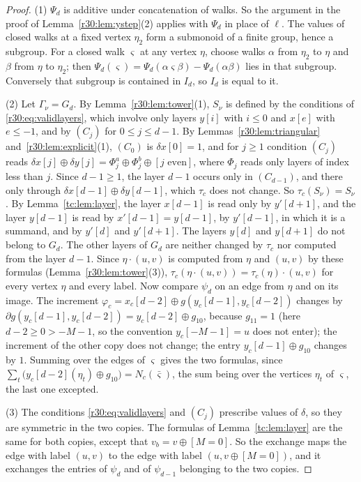 \begin{proof}
(1) $\Psi_d$ is additive under concatenation of walks. So the argument in the proof of Lemma~\ref{r30:lem:ystep}(2) applies with $\Psi_d$ in place of $\ell$. The values of closed walks at a fixed vertex $\eta_2$ form a submonoid of a finite group, hence a subgroup. For a closed walk $\varsigma$ at any vertex $\eta$, choose walks $\alpha$ from $\eta_2$ to $\eta$ and $\beta$ from $\eta$ to $\eta_2$; then $\Psi_d(\varsigma)=\Psi_d(\alpha\varsigma\beta)-\Psi_d(\alpha\beta)$ lies in that subgroup. Conversely that subgroup is contained in $I_d$, so $I_d$ is equal to it.

(2) Let $\Gamma_\nu=G_d$. By Lemma~\ref{r30:lem:tower}(1), $S_\nu$ is defined by the conditions of \eqref{r30:eq:validlayers}, which involve only layers $y[i]$ with $i\le0$ and $x[e]$ with $e\le-1$, and by $(C_j)$ for $0\le j\le d-1$. By Lemmas~\ref{r30:lem:triangular} and~\ref{r30:lem:explicit}(1), $(C_0)$ is $\delta x[0]=1$, and for $j\ge1$ condition $(C_j)$ reads $\delta x[j]\oplus\delta y[j]=\Phi^a_j\oplus\Phi^b_j\oplus[j\text{ even}]$, where $\Phi_j$ reads only layers of index less than $j$. Since $d-1\ge1$, the layer $d-1$ occurs only in $(C_{d-1})$, and there only through $\delta x[d-1]\oplus\delta y[d-1]$, which $\tau_c$ does not change. So $\tau_c(S_\nu)=S_\nu$. By Lemma~\ref{tc:lem:layer}, the layer $x[d-1]$ is read only by $y'[d+1]$, and the layer $y[d-1]$ is read by $x'[d-1]=y[d-1]$, by $y'[d-1]$, in which it is a summand, and by $y'[d]$ and $y'[d+1]$. The layers $y[d]$ and $y[d+1]$ do not belong to $G_d$. The other layers of $G_d$ are neither changed by $\tau_c$ nor computed from the layer $d-1$. Since $\eta\cdot(u,v)$ is computed from $\eta$ and $(u,v)$ by these formulas (Lemma~\ref{r30:lem:tower}(3)), $\tau_c(\eta\cdot(u,v))=\tau_c(\eta)\cdot(u,v)$ for every vertex $\eta$ and every label. Now compare $\psi_d$ on an edge from $\eta$ and on its image. The increment $\varphi_c=x_c[d-2]\oplus g(y_c[d-1],y_c[d-2])$ changes by $\partial g(y_c[d-1],y_c[d-2])=y_c[d-2]\oplus g_{10}$, because $g_{11}=1$ (here $d-2\ge0>-M-1$, so the convention $y_c[-M-1]=u$ does not enter); the increment of the other copy does not change; the entry $y_c[d-1]\oplus g_{10}$ changes by $1$. Summing over the edges of $\varsigma$ gives the two formulas, since $\sum_t\bigl(y_c[d-2](\eta_t)\oplus g_{10}\bigr)=N_c(\bar\varsigma)$, the sum being over the vertices $\eta_t$ of $\varsigma$, the last one excepted.

(3) The conditions \eqref{r30:eq:validlayers} and $(C_j)$ prescribe values of $\delta$, so they are symmetric in the two copies. The formulas of Lemma~\ref{tc:lem:layer} are the same for both copies, except that $v_b=v\oplus[M=0]$. So the exchange maps the edge with label $(u,v)$ to the edge with label $(u,v\oplus[M=0])$, and it exchanges the entries of $\psi_d$ and of $\psi_{d-1}$ belonging to the two copies.


\end{proof}
